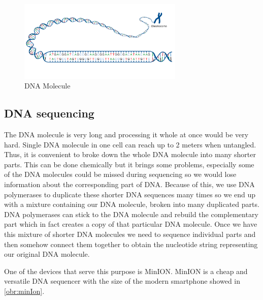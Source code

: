 
\begin{figure}
\centerline{\includegraphics[width=0.7\textwidth, height=0.3\textheight]{images/acgt}}
\caption[DNA]{DNA Molecule}
\label{obr:acgt}
\end{figure}

\subsection{DNA sequencing}

The DNA molecule is very long and processing it whole at once would be very hard.
Single DNA molecule in one cell can reach up to 2 meters when untangled.
Thus, it is convenient to broke down the whole DNA molecule into many shorter parts.
This can be done chemically but it brings some problems, especially some of the
DNA molecules could be missed during sequencing so we would lose information about
the corresponding part of DNA. Because of this, we use DNA polymerases to duplicate these shorter DNA sequences
many times so we end up with a mixture containing our DNA molecule, broken into
many duplicated parts. DNA polymerases can stick to the DNA molecule and rebuild the complementary
part which in fact creates a copy of that particular DNA molecule.
Once we have this mixture of shorter DNA molecules we need to sequence individual
parts and then somehow connect them together to obtain the nucleotide string representing
our original DNA molecule.

One of the devices that serve this purpose is MinION\cite{lu2016oxford}. MinION is
a cheap and versatile DNA sequencer with the size of the modern smartphone showed in
\ref{obr:minIon}.

